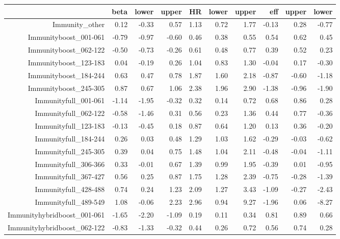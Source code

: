\begin{table}[ht]
\centering
\begin{tabular}{rrrrrrrrrr}
  \hline
 & beta & lower & upper & HR & lower & upper & eff & upper & lower \\ 
  \hline
Immunity\_other & 0.12 & -0.33 & 0.57 & 1.13 & 0.72 & 1.77 & -0.13 & 0.28 & -0.77 \\ 
  Immunityboost\_001-061 & -0.79 & -0.97 & -0.60 & 0.46 & 0.38 & 0.55 & 0.54 & 0.62 & 0.45 \\ 
  Immunityboost\_062-122 & -0.50 & -0.73 & -0.26 & 0.61 & 0.48 & 0.77 & 0.39 & 0.52 & 0.23 \\ 
  Immunityboost\_123-183 & 0.04 & -0.19 & 0.26 & 1.04 & 0.83 & 1.30 & -0.04 & 0.17 & -0.30 \\ 
  Immunityboost\_184-244 & 0.63 & 0.47 & 0.78 & 1.87 & 1.60 & 2.18 & -0.87 & -0.60 & -1.18 \\ 
  Immunityboost\_245-305 & 0.87 & 0.67 & 1.06 & 2.38 & 1.96 & 2.90 & -1.38 & -0.96 & -1.90 \\ 
  Immunityfull\_001-061 & -1.14 & -1.95 & -0.32 & 0.32 & 0.14 & 0.72 & 0.68 & 0.86 & 0.28 \\ 
  Immunityfull\_062-122 & -0.58 & -1.46 & 0.31 & 0.56 & 0.23 & 1.36 & 0.44 & 0.77 & -0.36 \\ 
  Immunityfull\_123-183 & -0.13 & -0.45 & 0.18 & 0.87 & 0.64 & 1.20 & 0.13 & 0.36 & -0.20 \\ 
  Immunityfull\_184-244 & 0.26 & 0.03 & 0.48 & 1.29 & 1.03 & 1.62 & -0.29 & -0.03 & -0.62 \\ 
  Immunityfull\_245-305 & 0.39 & 0.04 & 0.75 & 1.48 & 1.04 & 2.11 & -0.48 & -0.04 & -1.11 \\ 
  Immunityfull\_306-366 & 0.33 & -0.01 & 0.67 & 1.39 & 0.99 & 1.95 & -0.39 & 0.01 & -0.95 \\ 
  Immunityfull\_367-427 & 0.56 & 0.25 & 0.87 & 1.75 & 1.28 & 2.39 & -0.75 & -0.28 & -1.39 \\ 
  Immunityfull\_428-488 & 0.74 & 0.24 & 1.23 & 2.09 & 1.27 & 3.43 & -1.09 & -0.27 & -2.43 \\ 
  Immunityfull\_489-549 & 1.08 & -0.06 & 2.23 & 2.96 & 0.94 & 9.27 & -1.96 & 0.06 & -8.27 \\ 
  Immunityhybridboost\_001-061 & -1.65 & -2.20 & -1.09 & 0.19 & 0.11 & 0.34 & 0.81 & 0.89 & 0.66 \\ 
  Immunityhybridboost\_062-122 & -0.83 & -1.33 & -0.32 & 0.44 & 0.26 & 0.72 & 0.56 & 0.74 & 0.28 \\ 

\end{tabular}
\end{table}

